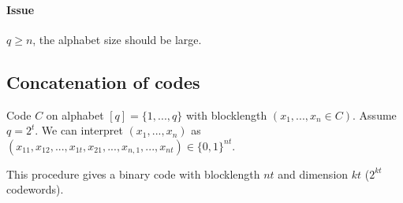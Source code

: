 \documentclass{article}
\begin{document}
\paragraph{Issue}$q\geq n$, the alphabet size should be large.


\subsection{Concatenation of codes}

Code $C$ on alphabet $[q]=\{1,...,q\}$ with blocklength $(x_1,...,x_n \in C)$. Assume $q=2^t$. We can interpret $(x_1,...,x_n)$ as $(x_{11},x_{12},...,x_{1t},x_{21},...,x_{n,1},...,x_{nt})\in \{0,1\}^{nt}$.

This procedure gives a binary code with blocklength $nt$ and dimension $kt$ ($2^{kt}$ codewords).
\end{document}
